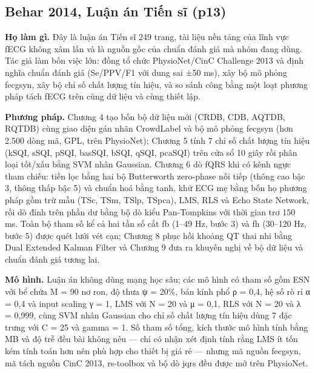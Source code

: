 \documentclass[12pt,a4paper]{article}
\begin{document}
\subsection{Behar 2014, Luận án Tiến sĩ \normalfont\small (p13)}
\par\vspace{2pt}
\par\vspace{4pt}
\noindent \textbf{Họ làm gì.} Đây là luận án Tiến sĩ 249 trang, tài liệu nền tảng của lĩnh vực fECG không xâm lấn và là nguồn gốc của chuẩn đánh giá mà nhóm đang dùng. Tác giả làm bốn việc lớn: đồng tổ chức PhysioNet/CinC Challenge 2013 và định nghĩa chuẩn đánh giá (Se/PPV/F1 với dung sai ±50 ms), xây bộ mô phỏng fecgsyn, xây bộ chỉ số chất lượng tín hiệu, và so sánh công bằng một loạt phương pháp tách fECG trên cùng dữ liệu và cùng thiết lập.\par\vspace{3pt}
\noindent \textbf{Phương pháp.} Chương 4 tạo bốn bộ dữ liệu mới (CRDB, CDB, AQTDB, RQTDB) cùng giao diện gán nhãn CrowdLabel và bộ mô phỏng fecgsyn (hơn 2.500 dòng mã, GPL, trên PhysioNet); Chương 5 tính 7 chỉ số chất lượng tín hiệu (kSQI, sSQI, pSQI, basSQI, bSQI, qSQI, pcaSQI) trên cửa sổ 10 giây rồi phân loại tốt/xấu bằng SVM nhân Gaussian. Chương 6 dò fQRS khi có kênh ngực tham chiếu: tiền lọc bằng hai bộ Butterworth zero-phase nối tiếp (thông cao bậc 3, thông thấp bậc 5) và chuẩn hoá bằng tanh, khử ECG mẹ bằng bốn họ phương pháp gồm trừ mẫu (TSc, TSm, TSlp, TSpca), LMS, RLS và Echo State Network, rồi dò đỉnh trên phần dư bằng bộ dò kiểu Pan-Tompkins với thời gian trơ 150 ms. Toàn bộ tham số kể cả hai tần số cắt fb (1–49 Hz, bước 3) và fh (30–120 Hz, bước 5) được quét lưới vét cạn; Chương 8 phục hồi khoảng QT thai nhi bằng Dual Extended Kalman Filter và Chương 9 đưa ra khuyến nghị về bộ dữ liệu và chuẩn đánh giá tương lai.\par\vspace{3pt}
\noindent \textbf{Mô hình.} Luận án không dùng mạng học sâu; các mô hình có tham số gồm ESN với bể chứa M = 90 nơ ron, độ thưa ψ = 20\%, bán kính phổ ρ = 0,4, hệ số rò rỉ α = 0,4 và input scaling γ = 1, LMS với N = 20 và μ = 0,1, RLS với N = 20 và λ = 0,999, cùng SVM nhân Gaussian cho chỉ số chất lượng tín hiệu dùng 7 đặc trưng với C = 25 và gamma = 1. Số tham số tổng, kích thước mô hình tính bằng MB và độ trễ đều bài không nêu — chỉ có nhận xét định tính rằng LMS ít tốn kém tính toán hơn nên phù hợp cho thiết bị giá rẻ — nhưng mã nguồn fecgsyn, mã tách nguồn CinC 2013, rs-toolbox và bộ dò jqrs đều được mở trên PhysioNet.\par\vspace{3pt}
\end{document}

